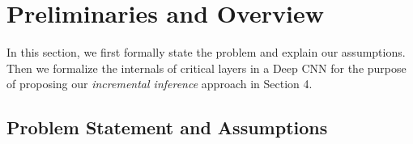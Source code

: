 \section{Preliminaries and Overview}\label{sec:preliminaries}
In this section, we first formally state the problem and explain our assumptions.
Then we formalize the internals of critical layers in a Deep CNN for the purpose of proposing our \textit{incremental inference} approach in Section 4.

\subsection{Problem Statement and Assumptions}

